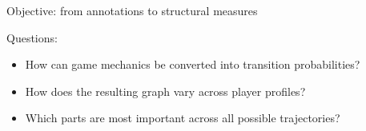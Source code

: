 \documentclass{beamer}
\begin{document}
\begin{frame}{Objective: from annotations to structural measures}
{
		}
		
		\vspace{0.1cm}
		
		\raggedright
		
		Questions:
		
		\begin{itemize}
			\item How can game mechanics be converted into transition probabilities?
			\item How does the resulting graph vary across player profiles?
			\item Which parts are most important across all possible trajectories?
		\end{itemize}
		
	\end{frame}
	
	
\end{document}
